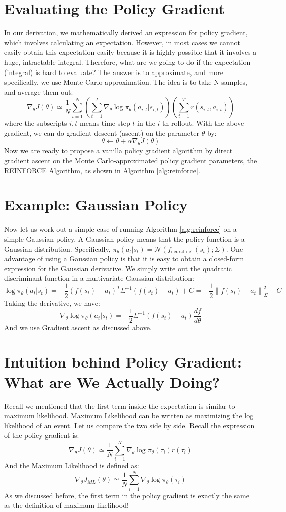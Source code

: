 \section{Evaluating the Policy Gradient}
In our derivation, we mathematically derived an expression for policy gradient, which involves calculating an expectation. However, in most cases we cannot easily obtain this expectation easily because it is highly possible that it involves a huge, intractable integral. Therefore, what are we going to do if the expectation (integral) is hard to evaluate? The answer is to approximate, and more specifically, we use Monte Carlo approximation. The idea is to take N samples, and average them out:
$$\nabla_\theta J(\theta) \simeq \frac{1}{N}\sum_{i=1}^N\left(\sum_{t=1}^T\nabla_\theta \log\pi_\theta(a_{i,t}|s_{i,t})\right)\left(\sum_{t=1}^T r(s_{i,t},a_{i,t})\right)$$
where the subscripts $i, t$ means time step $t$ in the $i$-th rollout. With the above gradient, we can do gradient descent (ascent) on the parameter $\theta$ by:
$$\theta \leftarrow \theta + \alpha\nabla_\theta J(\theta)$$ Now we are ready to propose a vanilla policy gradient algorithm by direct gradient ascent on the Monte Carlo-approximated policy gradient parameters, the REINFORCE Algorithm, as shown in Algorithm \ref{alg:reinforce}.


\section{Example: Gaussian Policy}
Now let us work out a simple case of running Algorithm \ref{alg:reinforce} on a simple Gaussian policy. A Gaussian policy means that the policy function is a Gaussian distribution. Specifically, $\pi_\theta(a_t|s_t) = \mathcal{N}\left(f_\text{neural net}(s_t); \Sigma\right)$. One advantage of using a Gaussian policy is that it is easy to obtain a closed-form expression for the Gaussian derivative. We simply write out the quadratic discriminant function in a multivariate Gaussian distribution:
$$\log \pi_\theta(a_t|s_t) = -\frac{1}{2}\left(f(s_t)-a_t\right)^T\Sigma^{-1}\left(f(s_t)-a_t\right) + C =  -\frac{1}{2}{\left\lVert f(s_t)-a_t\right\rVert}_\Sigma^2 + C$$
Taking the derivative, we have:
$$\nabla_\theta \log \pi_\theta(a_t|s_t) = -\frac{1}{2}\Sigma^{-1}(f(s_t)-a_t)\frac{df}{d\theta}$$
And we use Gradient ascent as discussed above.
\section{Intuition behind Policy Gradient: What are We Actually Doing?}
Recall we mentioned that the first term inside the expectation is similar to maximum likelihood. Maximum Likelihood can be written as maximizing the log likelihood of an event. Let us compare the two side by side. Recall the expression of the policy gradient is:
$$\nabla_\theta J(\theta) \simeq \frac{1}{N}\sum_{i=1}^N\nabla_\theta \log \pi_\theta(\tau_i)r(\tau_i)$$
And the Maximum Likelihood is defined as:
$$\nabla_\theta J_{ML}(\theta)\simeq\frac{1}{N}\sum_{i=1}^N\nabla_\theta \log \pi_\theta(\tau_i)$$
As we discussed before, the first term in the policy gradient is exactly the same as the definition of maximum likelihood!


